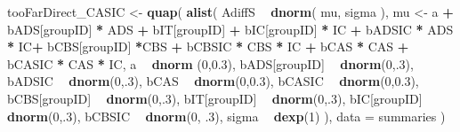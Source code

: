 \documentclass[10pt,dvipsnames,enabledeprecatedfontcommands]{scrartcl}
\newenvironment{Shaded}{\begin{snugshade}}{\end{snugshade}}
\newcommand{\KeywordTok}[1]{\textcolor[rgb]{0.13,0.29,0.53}{\textbf{#1}}}
\newcommand{\DataTypeTok}[1]{\textcolor[rgb]{0.13,0.29,0.53}{#1}}
\newcommand{\DecValTok}[1]{\textcolor[rgb]{0.00,0.00,0.81}{#1}}
\newcommand{\FloatTok}[1]{\textcolor[rgb]{0.00,0.00,0.81}{#1}}
\newcommand{\StringTok}[1]{\textcolor[rgb]{0.31,0.60,0.02}{#1}}
\newcommand{\OperatorTok}[1]{\textcolor[rgb]{0.81,0.36,0.00}{\textbf{#1}}}
\newcommand{\NormalTok}[1]{#1}
\begin{document}
\begin{Shaded}
\begin{Highlighting}[]
\NormalTok{tooFarDirect_CASIC <-}\StringTok{ }\KeywordTok{quap}\NormalTok{(}
  \KeywordTok{alist}\NormalTok{(}
\NormalTok{    AdiffS }\OperatorTok{~}\StringTok{ }\KeywordTok{dnorm}\NormalTok{( mu, sigma ),}
\NormalTok{    mu <-}\StringTok{ }\NormalTok{a }\OperatorTok{+}\StringTok{ }\NormalTok{bADS[groupID] }\OperatorTok{*}\StringTok{ }\NormalTok{ADS }\OperatorTok{+}\StringTok{  }\NormalTok{bIT[groupID] }\OperatorTok{+}\StringTok{ }\NormalTok{bIC[groupID] }\OperatorTok{*}\StringTok{ }\NormalTok{IC }\OperatorTok{+}\StringTok{ }
\StringTok{      }\NormalTok{bADSIC }\OperatorTok{*}\StringTok{ }\NormalTok{ADS }\OperatorTok{*}\StringTok{ }\NormalTok{IC}\OperatorTok{+}\StringTok{ }\NormalTok{bCBS[groupID] }\OperatorTok{*}\NormalTok{CBS }\OperatorTok{+}\StringTok{ }\NormalTok{bCBSIC }\OperatorTok{*}\StringTok{ }\NormalTok{CBS }\OperatorTok{*}\StringTok{ }\NormalTok{IC }\OperatorTok{+}\StringTok{ }\NormalTok{bCAS }\OperatorTok{*}\StringTok{ }\NormalTok{CAS }\OperatorTok{+}\StringTok{ }\NormalTok{bCASIC }\OperatorTok{*}\StringTok{ }\NormalTok{CAS }\OperatorTok{*}\StringTok{ }\NormalTok{IC, }
\NormalTok{    a }\OperatorTok{~}\StringTok{ }\KeywordTok{dnorm}\NormalTok{ (}\DecValTok{0}\NormalTok{,}\FloatTok{0.3}\NormalTok{),}
\NormalTok{    bADS[groupID] }\OperatorTok{~}\StringTok{ }\KeywordTok{dnorm}\NormalTok{(}\DecValTok{0}\NormalTok{,.}\DecValTok{3}\NormalTok{),}
\NormalTok{    bADSIC }\OperatorTok{~}\StringTok{ }\KeywordTok{dnorm}\NormalTok{(}\DecValTok{0}\NormalTok{,.}\DecValTok{3}\NormalTok{),}
\NormalTok{    bCAS }\OperatorTok{~}\StringTok{ }\KeywordTok{dnorm}\NormalTok{(}\DecValTok{0}\NormalTok{,}\FloatTok{0.3}\NormalTok{),}
\NormalTok{    bCASIC }\OperatorTok{~}\StringTok{ }\KeywordTok{dnorm}\NormalTok{(}\DecValTok{0}\NormalTok{,}\FloatTok{0.3}\NormalTok{),}
\NormalTok{    bCBS[groupID] }\OperatorTok{~}\StringTok{ }\KeywordTok{dnorm}\NormalTok{(}\DecValTok{0}\NormalTok{,.}\DecValTok{3}\NormalTok{),}
\NormalTok{    bIT[groupID] }\OperatorTok{~}\StringTok{ }\KeywordTok{dnorm}\NormalTok{(}\DecValTok{0}\NormalTok{,.}\DecValTok{3}\NormalTok{),}
\NormalTok{    bIC[groupID] }\OperatorTok{~}\StringTok{ }\KeywordTok{dnorm}\NormalTok{(}\DecValTok{0}\NormalTok{,.}\DecValTok{3}\NormalTok{),}
\NormalTok{    bCBSIC }\OperatorTok{~}\StringTok{ }\KeywordTok{dnorm}\NormalTok{(}\DecValTok{0}\NormalTok{, }\FloatTok{.3}\NormalTok{),}
\NormalTok{    sigma  }\OperatorTok{~}\StringTok{ }\KeywordTok{dexp}\NormalTok{(}\DecValTok{1}\NormalTok{)}
\NormalTok{  ), }
  \DataTypeTok{data =}\NormalTok{ summaries}
\NormalTok{)}



\end{Highlighting}
\end{Shaded}
\end{document}
